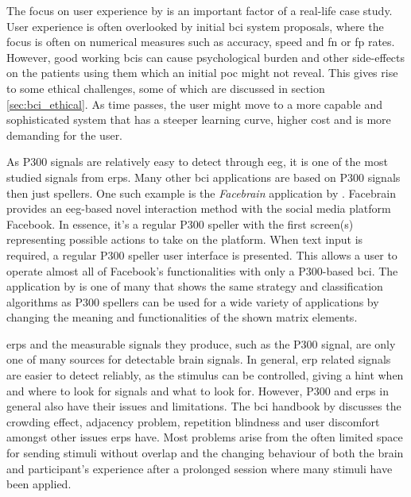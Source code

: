The focus on user experience by \citet{p300_speller_real_life2} is an important factor of a real-life case study.
User experience is often overlooked by initial \gls{bci} system proposals, where the focus is often on numerical measures such as accuracy, speed and \gls{fn} or \gls{fp} rates.
However, good working \glspl{bci} can cause psychological burden and other side-effects on the patients using them which an initial \gls{poc} might not reveal.
This gives rise to some ethical challenges, some of which are discussed in section \ref{sec:bci_ethical}.
As time passes, the user might move to a more capable and sophisticated system that has a steeper learning curve, higher cost and is more demanding for the user.

As P300 signals are relatively easy to detect through \gls{eeg}, it is one of the most studied signals from \glspl{erp}.
Many other \gls{bci} applications are based on P300 signals then just spellers.
One such example is the \textit{Facebrain} application by \citet{facebrain}.
Facebrain provides an \gls{eeg}-based novel interaction method with the social media platform Facebook.
In essence, it's a regular P300 speller with the first screen(s) representing possible actions to take on the platform.
When text input is required, a regular P300 speller user interface is presented.
This allows a user to operate almost all of Facebook's functionalities with only a P300-based \gls{bci}.
The application by \citet{facebrain} is one of many that shows the same strategy and classification algorithms as P300 spellers can be used for a wide variety of applications by changing the meaning and functionalities of the shown matrix elements.

\glspl{erp} and the measurable signals they produce, such as the P300 signal, are only one of many sources for detectable brain signals.
In general, \gls{erp} related signals are easier to detect reliably, as the stimulus can be controlled, giving a hint when and where to look for signals and what to look for.
However, P300 and \glspl{erp} in general also have their issues and limitations.
The \gls{bci} handbook by \citet[Chapter~26]{bci_handbook} discusses the crowding effect, adjacency problem, repetition blindness and user discomfort amongst other issues \glspl{erp} have.
Most problems arise from the often limited space for sending stimuli without overlap and the changing behaviour of both the brain and participant's experience after a prolonged session where many stimuli have been applied.

